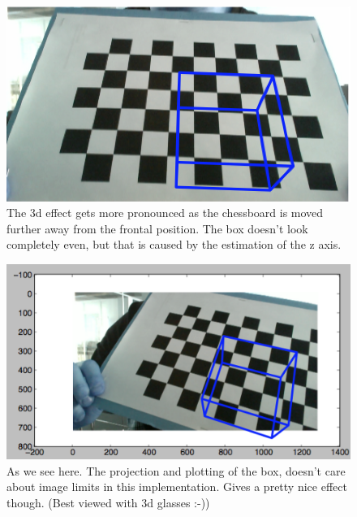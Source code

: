 \begin{figure}[H]
\center
\includegraphics{pics/result2.png}
\caption{The 3d effect gets more pronounced as the chessboard is moved further away from the frontal position. The box doesn’t look completely even, but that is caused by the estimation of the z axis.}
\label{result2}
\end{figure}

\begin{figure}[H]
\center
\includegraphics{pics/result3.png}
\caption{As we see here. The projection and plotting of the box, doesn’t care about image limits in this implementation. Gives a pretty nice effect though. (Best viewed with 3d glasses :-))}
\label{result3}
\end{figure}


